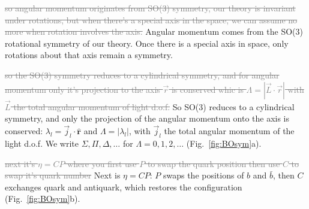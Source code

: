 \documentclass[11pt,a4paper]{article}
\newcommand{\aifix}[2]{\textcolor{gray}{\sout{#1}} \textcolor{aicolor}{#2}}
\newcommand{\aifix}[2]{#2}
\newenvironment{aiadd}{\par}{\par}
\begin{document}
\begin{aiadd}
\begin{center}
		\label{fig:BOsym}
	\end{center}
\end{aiadd}

\aifix{so angular momentum originates from SO(3) symmetry, our theory is invariant under rotations, but when there's a special axis in the space, we can assume no more when rotation involves the axis.}{Angular momentum comes from the SO(3) rotational symmetry of our theory. Once there is a special axis in space, only rotations about that axis remain a symmetry.}

\aifix{so the SO(3) symmetry reduces to a cylindrical symmetry, and for angular momentum only it's projection to the axis $\vec{r}$ is conserved whic is $\Lambda = |\vec{L} \cdot \vec{r}|$ with $\vec{L}$ the total angular momentum of light d.o.f.}{So SO(3) reduces to a cylindrical symmetry, and only the projection of the angular momentum onto the axis is conserved: $\lambda_l=\vec j_l\cdot\hat{\bm r}$ and $\Lambda=|\lambda_l|$, with $\vec j_l$ the total angular momentum of the light d.o.f. We write $\Sigma,\Pi,\Delta,\dots$ for $\Lambda=0,1,2,\dots$ (Fig.~\ref{fig:BOsym}a).}


\aifix{next it's $\eta = CP$ where you first use $P$ to swap the quark position then use $C$ to swap it's quark number}{Next is $\eta=CP$: $P$ swaps the positions of $b$ and $\bar b$, then $C$ exchanges quark and antiquark, which restores the configuration (Fig.~\ref{fig:BOsym}b).}
\end{document}
